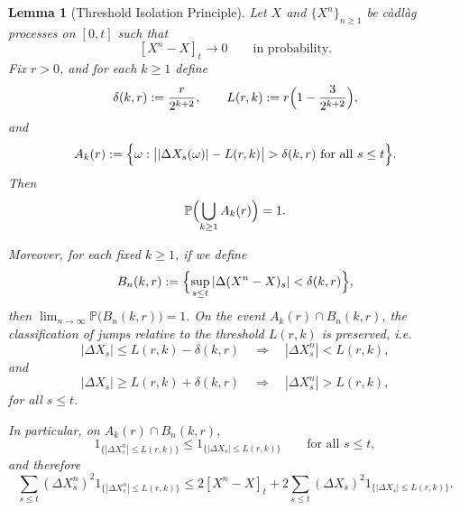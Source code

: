\documentclass[a4paper,10pt]{article}
\newtheorem{lemma}[thm]{Lemma}
\begin{document}
\begin{lemma}[Threshold Isolation Principle]
\label{lem:thres}
Let $X$ and $\{X^n\}_{n\ge1}$ be c\`adl\`ag processes on $[0,t]$ such that
\[
[X^n-X]_t \to 0
\qquad \text{in probability}.
\]
Fix $r>0$, and for each $k\ge1$ define
\[
\delta(k,r):=\frac{r}{2^{k+2}},
\qquad
L(r,k):=r\Bigl(1-\frac{3}{2^{k+2}}\Bigr),
\]
and
\[
A_k(r)
:=
\Bigl\{
\omega:
\bigl||\Delta X_s(\omega)|-L(r,k)\bigr|>\delta(k,r)
\text{ for all } s\le t
\Bigr\}.
\]
Then
\[
\mathbb P\Bigl(\bigcup_{k\ge1}A_k(r)\Bigr)=1.
\]

Moreover, for each fixed $k\ge1$, if we define
\[
B_n(k,r)
:=
\Bigl\{
\sup_{s\le t}|\Delta(X^n-X)_s|<\delta(k,r)
\Bigr\},
\]
then
$
\lim_{n\to\infty}\mathbb P\bigl(B_n(k,r)\bigr)=1.
$
On the event $A_k(r)\cap B_n(k,r)$, the classification of jumps relative to the threshold
$L(r,k)$ is preserved, i.e.
\[
|\Delta X_s|\le L(r,k)-\delta(k,r)
\quad\Longrightarrow\quad
|\Delta X^n_s|<L(r,k),
\]
and
\[
|\Delta X_s|\ge L(r,k)+\delta(k,r)
\quad\Longrightarrow\quad
|\Delta X^n_s|>L(r,k),
\]
for all $s\le t$.

In particular, on $A_k(r)\cap B_n(k,r)$,
\[
1_{\{|\Delta X^n_s|\le L(r,k)\}}
\le
1_{\{|\Delta X_s|\le L(r,k)\}}
\qquad \text{for all } s\le t,
\]
and therefore
\[
\sum_{s\le t} (\Delta X^n_s)^2 1_{\{|\Delta X^n_s|\le L(r,k)\}}
\le
2[X^n-X]_t
+
2\sum_{s\le t} (\Delta X_s)^2 1_{\{|\Delta X_s|\le L(r,k)\}}.
\]
\end{lemma}
\end{document}
